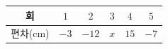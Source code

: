 {\renewcommand{\arraystretch}{1.35}\small
\begin{tabular}{|c|c|c|c|c|c|}
\hline
회 & $1$ & $2$ & $3$ & $4$ & $5$ \\ \hline
편차(cm) & $-3$ & $-12$ & $x$ & $15$ & $-7$ \\ \hline
\end{tabular}}
